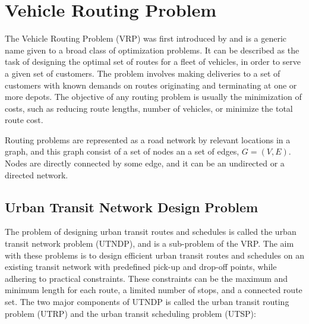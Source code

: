 \section{Vehicle Routing Problem }
\label{sec:VRP}
The Vehicle Routing Problem (VRP) was first introduced by \citet{dantzig59} and is a generic name given to a broad class of optimization problems. It can be described as the task of designing the optimal set of routes for a fleet of vehicles, in order to serve a given set of customers. The problem involves making deliveries to a set of customers with known demands on routes originating and terminating at one or more depots. The objective of any routing problem is usually the minimization of costs, such as reducing route lengths, number of vehicles, or minimize the total route cost.

Routing problems are represented as a road network by relevant locations in a graph, and this graph consist of a set of nodes an a set of edges, $G = (V,E)$. Nodes are directly connected by some edge, and it can be an undirected or a directed network. 
\subsection{Urban Transit Network Design Problem}

The problem of designing urban transit routes and schedules is called the urban transit network problem (UTNDP), and is a sub-problem of the VRP. The aim with these problems is to design efficient urban transit routes and schedules on an existing transit network with predefined pick-up and drop-off points, while adhering to practical constraints. These constraints can be the maximum and minimum length for each route, a limited number of stops, and a connected route set. The two major components of UTNDP is called the urban transit routing problem (UTRP) and the urban transit scheduling problem (UTSP):

